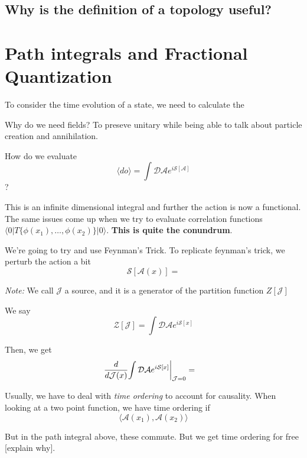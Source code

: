 \documentclass{article}
\newcommand{\inner}[2]{\langle #1 | #2 \rangle}
\newcommand{\restr}[2]{{%
  \left.\kern-\nulldelimiterspace %
  #1 %
  \vphantom{\big|} %
  \right|_{#2} %
  }}
\begin{document}
\subsection*{Why is the definition of a topology useful?}

\pagebreak


\section{Path integrals and Fractional Quantization}

To consider the time evolution of a state, we need to calculate the 


\vskip 0.5cm
Why do we need fields? To preseve unitary while being able to talk about particle creation and annihilation.

\vskip 0.5cm
How do we evaluate 
\[ \langle do \rangle = \int \mathcal{D A} e^{i\mathcal{S}[\mathcal{A}]} \]
?

\vskip 0.5cm
This is an infinite dimensional integral and further the action is now a functional. The same issues come up when we try to evaluate correlation functions $\inner{0}{T\{ \phi(x_1), \dots, \phi(x_2) \}|0}$. \textbf{This is quite the conundrum}.

\vskip 0.5cm
We're going to try and use Feynman's Trick. To replicate feynman's trick, we perturb the action a bit 
\[ \mathcal{S}[\mathcal{A}(x)] =  \]

\emph{Note:} We call $\mathcal J$ a source, and it is a generator of the partition function $Z[\mathcal{J}]$

We say 
\[ \mathcal{Z}[\mathcal{J}] = \int \mathcal{D} \mathcal{A} e^{i \mathcal{S}[x]} \]

Then, we get 
\begin{align*}
  \frac{d}{d\mathcal{J}(x)} \restr{\int \mathcal{D} \mathcal{A} e^{i \mathcal{S}[x]}}{\mathcal{J} = 0} &= 
\end{align*}

\vskip 0.5cm
Usually, we have to deal with \emph{time ordering} to account for causality. When looking at a two point function, we have time ordering if 
\[ \langle \mathcal{A}(x_1), \mathcal{A}(x_2) \rangle \] 


\vskip 0.5cm
But in the path integral above, these commute. But we get time ordering for free [explain why].
\end{document}
